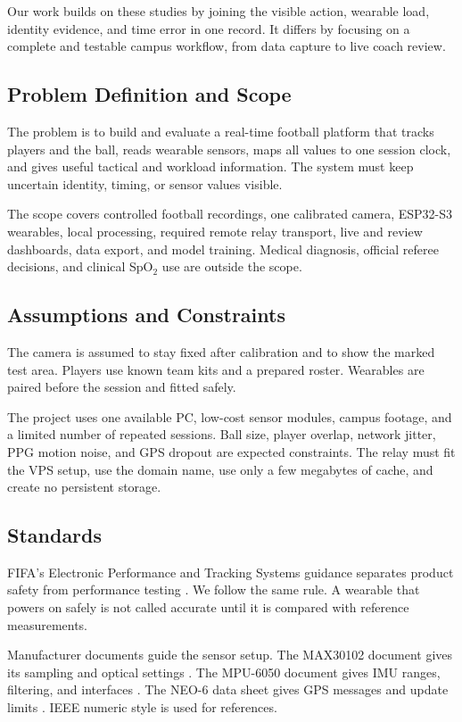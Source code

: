 Our work builds on these studies by joining the visible action, wearable load,
identity evidence, and time error in one record. It differs by focusing on a
complete and testable campus workflow, from data capture to live coach review.

\subsection{Problem Definition and Scope}
The problem is to build and evaluate a real-time football platform that tracks
players and the ball, reads wearable sensors, maps all values to one session
clock, and gives useful tactical and workload information. The system must keep
uncertain identity, timing, or sensor values visible.

The scope covers controlled football recordings, one calibrated camera,
ESP32-S3 wearables, local processing, required remote relay transport, live and
review dashboards, data export, and model training. Medical diagnosis, official
referee decisions, and clinical SpO$_2$ use are outside the scope.

\subsection{Assumptions and Constraints}
The camera is assumed to stay fixed after calibration and to show the marked
test area. Players use known team kits and a prepared roster. Wearables are
paired before the session and fitted safely.

The project uses one available PC, low-cost sensor modules, campus footage, and
a limited number of repeated sessions. Ball size, player overlap, network
jitter, PPG motion noise, and GPS dropout are expected constraints. The relay
must fit the VPS setup, use the domain name, use only a few megabytes of cache,
and create no persistent storage.

\subsection{Standards}
FIFA's Electronic Performance and Tracking Systems guidance separates product
safety from performance testing \cite{fifaepts}. We follow the same rule. A
wearable that powers on safely is not called accurate until it is compared with
reference measurements.

Manufacturer documents guide the sensor setup. The MAX30102 document gives its
sampling and optical settings \cite{max30102}. The MPU-6050 document gives IMU
ranges, filtering, and interfaces \cite{mpu6050}. The NEO-6 data sheet gives GPS
messages and update limits \cite{neo6}. IEEE numeric style is used for
references.

